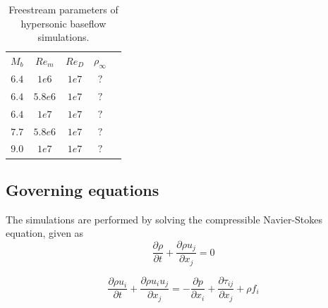 \documentclass[lineno]{jfm}
\begin{document}
\begin{table}
  \begin{center}

\begin{tabular}{ccccc}
  $M_b$ & $Re_m$  & $Re_D$ & $\rho_\infty$  \\[3pt] 
   $6.4$  &  $1e6$  &  $1e7$   &  $?$       \\
   $6.4$  &  $5.8e6$  &  $1e7$   &  $?$       \\
   $6.4$  &  $1e7$  &  $1e7$   &  $?$       \\
   $7.7$  &  $5.8e6$  &  $1e7$   &  $?$       \\
   $9.0$  &  $1e7$  &  $1e7$   &  $?$       \\
      
\end{tabular}

  \caption{Freestream parameters of hypersonic baseflow simulations.}
  \label{tab: flow_condition}
  \end{center}
\end{table}



\subsection{Governing equations}
The simulations are performed by solving the compressible Navier-Stokes equation, given as 
\begin{equation}
\dfrac{\partial \rho}{\partial t} + \dfrac{\partial \rho u_j }{\partial x_j} = 0
\end{equation}

\begin{equation}
\dfrac{\partial \rho u_i}{\partial t} + \dfrac{\partial \rho u_i u_j }{\partial x_j} = -\dfrac{\partial p}{\partial x_i} +\dfrac{\partial \tau_{ij}}{\partial x_j} + \rho f_i
\end{equation}
\end{document}
